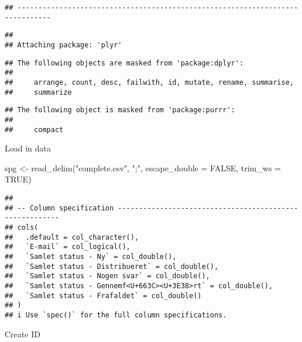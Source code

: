 \documentclass[
]{article}
\newenvironment{Shaded}{\begin{snugshade}}{\end{snugshade}}
\newcommand{\AttributeTok}[1]{\textcolor[rgb]{0.77,0.63,0.00}{#1}}
\newcommand{\ConstantTok}[1]{\textcolor[rgb]{0.00,0.00,0.00}{#1}}
\newcommand{\FunctionTok}[1]{\textcolor[rgb]{0.00,0.00,0.00}{#1}}
\newcommand{\NormalTok}[1]{#1}
\newcommand{\OtherTok}[1]{\textcolor[rgb]{0.56,0.35,0.01}{#1}}
\newcommand{\StringTok}[1]{\textcolor[rgb]{0.31,0.60,0.02}{#1}}
\begin{document}
\begin{verbatim}
## ------------------------------------------------------------------------------
\end{verbatim}

\begin{verbatim}
## 
## Attaching package: 'plyr'
\end{verbatim}

\begin{verbatim}
## The following objects are masked from 'package:dplyr':
## 
##     arrange, count, desc, failwith, id, mutate, rename, summarise,
##     summarize
\end{verbatim}

\begin{verbatim}
## The following object is masked from 'package:purrr':
## 
##     compact
\end{verbatim}

Load in data

\begin{Shaded}
\begin{Highlighting}[]
\NormalTok{spg }\OtherTok{\textless{}{-}} \FunctionTok{read\_delim}\NormalTok{(}\StringTok{"complete.csv"}\NormalTok{, }\StringTok{";"}\NormalTok{, }
    \AttributeTok{escape\_double =} \ConstantTok{FALSE}\NormalTok{, }\AttributeTok{trim\_ws =} \ConstantTok{TRUE}\NormalTok{)}
\end{Highlighting}
\end{Shaded}

\begin{verbatim}
## 
## -- Column specification --------------------------------------------------------
## cols(
##   .default = col_character(),
##   `E-mail` = col_logical(),
##   `Samlet status - Ny` = col_double(),
##   `Samlet status - Distribueret` = col_double(),
##   `Samlet status - Nogen svar` = col_double(),
##   `Samlet status - Gennemf<U+663C><U+3E38>rt` = col_double(),
##   `Samlet status - Frafaldet` = col_double()
## )
## i Use `spec()` for the full column specifications.
\end{verbatim}

Create ID
\end{document}
